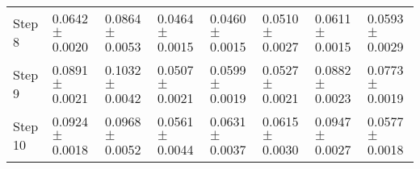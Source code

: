 \documentclass{ieeeaccess}
\begin{document}
\begin{table*}[htbp]
\begin{tabular}{llllllll}
Step 8 &  
0.0642	$\pm$ 0.0020 & 
0.0864$\pm$ 	0.0053 & 
0.0464$\pm$ 	0.0015& 
0.0460$\pm$ 	0.0015& 
0.0510$\pm$ 	0.0027& 
0.0611$\pm$ 	0.0015& 0.0593$\pm$	0.0029\\
Step 9 &  
0.0891$\pm$	0.0021&
0.1032$\pm$	0.0042&
0.0507$\pm$	0.0021&
0.0599$\pm$	0.0019&
0.0527$\pm$	0.0021&
0.0882$\pm$	0.0023& 0.0773$\pm$	0.0019\\
Step 10 &  
0.0924$\pm$	0.0018&
0.0968$\pm$	0.0052&
0.0561$\pm$	0.0044&
0.0631$\pm$	0.0037&
0.0615$\pm$	0.0030&
0.0947$\pm$	0.0027& 0.0577$\pm$	0.0018\\
\hline
 
\end{tabular}

\end{table*}
\end{document}
